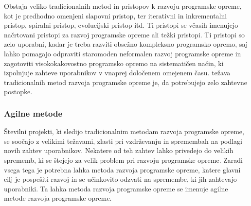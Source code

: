 \documentclass[a4paper,12pt,openright]{book}
\begin{document}
\cite{aggarwal2005software}

Obstaja veliko tradicionalnih metod in pristopov k razvoju programske opreme, kot je predhodno omenjeni slapovni pristop, ter iterativni in inkrementalni pristop, spiralni pristop, evolucijski pristop itd. Ti pristopi se včasih imenujejo načrtovani pristopi za razvoj programske opreme ali težki pristopi.  Ti pristopi so zelo uporabni, kadar je treba razviti obsežno kompleksno programsko opremo, saj lahko pomagajo odpraviti staromoden neformalen razvoj programske opreme in zagotoviti visokokakovostno programsko opremo na sistematičen način, ki izpolnjuje zahteve uporabnikov v vnaprej določenem omejenem času. težava tradicionalnih metod razvoja programske opreme je, da potrebujejo zelo zahtevne postopke.


\subsubsection{Agilne metode}
Številni projekti, ki sledijo tradicionalnim metodam razvoja programske opreme, se soočajo z velikimi težavami, zlasti pri vzdrževanju in spremembah na podlagi novih zahtev uporabnikov. Nekatere od teh zahtev lahko privedejo do velikih sprememb, ki se štejejo za velik problem pri razvoju programske opreme.  Zaradi vsega tega je potrebna lahka metoda razvoja programske opreme, katere glavni cilj je pospešiti razvoj in se učinkovito odzvati na spremembe, ki jih zahtevajo uporabniki. Ta lahka metoda razvoja programske opreme se imenuje agilne metode razvoja programske opreme. 
\cite{AlSaqqa2020AgileSD}
\end{document}

